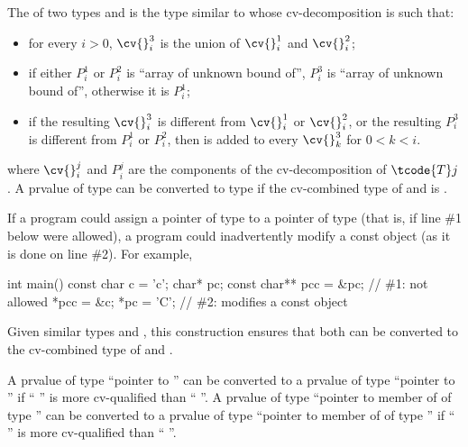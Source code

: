 \pnum
The  of two types  and 
is the type 
similar to  whose cv-decomposition is such that:
\begin{itemize}
\item
for every $i > 0$, $\cv{}^3_i$ is the union of
$\cv{}^1_i$ and $\cv{}^2_i$;
\item
if either $P^1_i$ or $P^2_i$ is ``array of unknown bound of'',
$P^3_i$ is ``array of unknown bound of'', otherwise it is $P^1_i$;
\item
if the resulting $\cv{}^3_i$ is different from $\cv{}^1_i$ or $\cv{}^2_i$,
or the resulting $P^3_i$ is different from $P^1_i$ or $P^2_i$,
then  is added to every $\cv{}^3_k$ for $0 < k < i$.
\end{itemize}
where $\cv{}^j_i$ and $P^j_i$ are the components of
the cv-decomposition of $\tcode{T}j$.
A prvalue of type 
can be converted to type 
if the cv-combined type of  and  is .
\begin{note}
If a program could assign a pointer of type  to a pointer of
type   (that is, if line \#1 below were
allowed), a program could inadvertently modify a const object
(as it is done on line \#2). For example,
\begin{codeblock}
int main() {
  const char c = 'c';
  char* pc;
  const char** pcc = &pc;       // \#1: not allowed
  *pcc = &c;
  *pc = 'C';                    // \#2: modifies a const object
}
\end{codeblock}
\end{note}
\begin{note}
Given similar types  and , this
construction ensures that
both can be converted to the cv-combined type of  and .
\end{note}

\pnum
\begin{note}
A prvalue of type ``pointer to  '' can be
converted to a prvalue of type ``pointer to  '' if
`` '' is more cv-qualified than ``
''.
A prvalue of type ``pointer to member of  of type 
'' can be converted to a prvalue of type ``pointer to member
of  of type  '' if ``
'' is more cv-qualified than `` ''.
\end{note}


